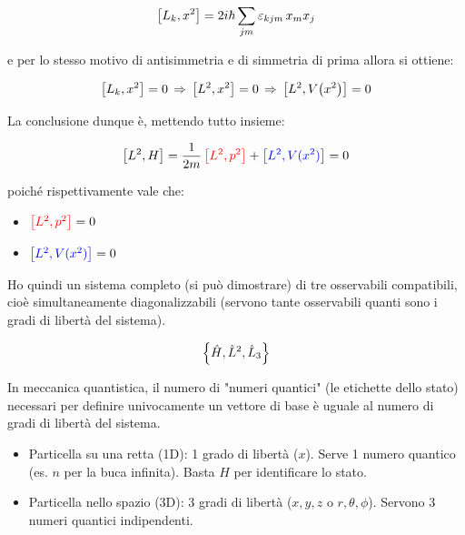 \begin{myapprf}
\begin{itemize}
	\begin{align*}
		\qty[L_k, x^2]  = 2i\hbar \sum_{jm} \varepsilon_{kjm} \, x_m x_j 
	\end{align*}
	
		e per lo stesso motivo di antisimmetria e di simmetria di prima allora si ottiene:
	
	\begin{align*}
		\qty[L_k, x^2] = 0 \, \Rightarrow \, \qty[L^2, x^2] = 0  \, \Rightarrow \,  \qty[L^2, V\qty(x^2)] = 0
	\end{align*}

\end{itemize}
	
	La conclusione dunque è, mettendo tutto insieme:
	
\begin{align*}
	 \qty[L^2, H] = \frac{1}{2m} \, \textcolor{red}{\qty[L^2, p^2]} + \textcolor{blue}{\qty[L^2, V(x^2)] } = 0
\end{align*}

	poiché rispettivamente vale che:
	
\begin{itemize}
	\item $\textcolor{red}{\qty[L^2, p^2]} = 0$
	
	\item $\textcolor{blue}{\qty[L^2, V(x^2)] } = 0$
\end{itemize}

\end{myapprf}

	Ho quindi un sistema completo (si può dimostrare) di tre osservabili compatibili, cioè simultaneamente diagonalizzabili (servono tante osservabili quanti sono i gradi di libertà del sistema). 

\begin{align*}
	\qty{\hat{H}, \hat{L}^2, \hat{L}_3}
\end{align*}

	In meccanica quantistica, il numero di "numeri quantici" (le etichette dello stato) necessari per definire univocamente un vettore di base è uguale al numero di gradi di libertà del sistema.

\begin{itemize}
	\item Particella su una retta (1D): 1 grado di libertà ($x$). Serve 1 numero quantico (es. $n$ per la buca infinita). Basta $H$ per identificare lo stato.
	\item Particella nello spazio (3D): 3 gradi di libertà ($x, y, z$ o $r, \theta, \phi$). Servono 3 numeri quantici indipendenti.
\end{itemize}

